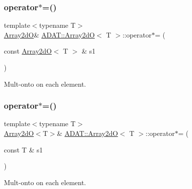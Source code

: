 \subsubsection{\texorpdfstring{operator$\ast$=()}{operator*=()}\hspace{0.1cm}{\footnotesize\ttfamily [2/4]}}
{\footnotesize\ttfamily template$<$typename T$>$ \\
\mbox{\hyperlink{classADAT_1_1Array2dO}{Array2dO}}\& \mbox{\hyperlink{classADAT_1_1Array2dO}{A\+D\+A\+T\+::\+Array2dO}}$<$ T $>$\+::operator$\ast$= (\begin{DoxyParamCaption}\item[{const \mbox{\hyperlink{classADAT_1_1Array2dO}{Array2dO}}$<$ T $>$ \&}]{s1 }\end{DoxyParamCaption})\hspace{0.3cm}{\ttfamily [inline]}}



Mult-\/onto on each element. 

\mbox{\label{classADAT_1_1Array2dO_a12856ac75f975aa6b013eac9eadd7180}} 
\subsubsection{\texorpdfstring{operator$\ast$=()}{operator*=()}\hspace{0.1cm}{\footnotesize\ttfamily [3/4]}}
{\footnotesize\ttfamily template$<$typename T$>$ \\
\mbox{\hyperlink{classADAT_1_1Array2dO}{Array2dO}}$<$T$>$\& \mbox{\hyperlink{classADAT_1_1Array2dO}{A\+D\+A\+T\+::\+Array2dO}}$<$ T $>$\+::operator$\ast$= (\begin{DoxyParamCaption}\item[{const T \&}]{s1 }\end{DoxyParamCaption})\hspace{0.3cm}{\ttfamily [inline]}}



Mult-\/onto on each element. 

\mbox{\label{classADAT_1_1Array2dO_a12856ac75f975aa6b013eac9eadd7180}} 
